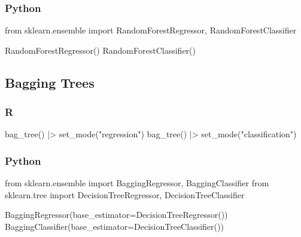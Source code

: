 \documentclass[
  letterpaper,
  DIV=11,
  numbers=noendperiod]{scrreprt}
\newenvironment{Shaded}{\begin{snugshade}}{\end{snugshade}}
\newcommand{\FunctionTok}[1]{\textcolor[rgb]{0.28,0.35,0.67}{#1}}
\newcommand{\ImportTok}[1]{\textcolor[rgb]{0.00,0.46,0.62}{#1}}
\newcommand{\NormalTok}[1]{\textcolor[rgb]{0.00,0.46,0.62}{#1}}
\newcommand{\OperatorTok}[1]{\textcolor[rgb]{0.37,0.37,0.37}{#1}}
\newcommand{\SpecialCharTok}[1]{\textcolor[rgb]{0.37,0.37,0.37}{#1}}
\newcommand{\StringTok}[1]{\textcolor[rgb]{0.13,0.47,0.30}{#1}}
\begin{document}
\hypertarget{python-77}{%
\subsubsection{Python}\label{python-77}}

\begin{Shaded}
\begin{Highlighting}[]
\ImportTok{from}\NormalTok{ sklearn.ensemble }\ImportTok{import}\NormalTok{ RandomForestRegressor, RandomForestClassifier}

\NormalTok{RandomForestRegressor()}
\NormalTok{RandomForestClassifier()}
\end{Highlighting}
\end{Shaded}

\hypertarget{bagging-trees}{%
\subsection{Bagging Trees}\label{bagging-trees}}

\hypertarget{r-78}{%
\subsubsection{R}\label{r-78}}

\begin{Shaded}
\begin{Highlighting}[]
\FunctionTok{bag\_tree}\NormalTok{() }\SpecialCharTok{|\textgreater{}} \FunctionTok{set\_mode}\NormalTok{(}\StringTok{"regression"}\NormalTok{)}
\FunctionTok{bag\_tree}\NormalTok{() }\SpecialCharTok{|\textgreater{}} \FunctionTok{set\_mode}\NormalTok{(}\StringTok{"classification"}\NormalTok{)}
\end{Highlighting}
\end{Shaded}

\hypertarget{python-78}{%
\subsubsection{Python}\label{python-78}}

\begin{Shaded}
\begin{Highlighting}[]
\ImportTok{from}\NormalTok{ sklearn.ensemble }\ImportTok{import}\NormalTok{ BaggingRegressor, BaggingClassifier}
\ImportTok{from}\NormalTok{ sklearn.tree }\ImportTok{import}\NormalTok{ DecisionTreeRegressor, DecisionTreeClassifier}

\NormalTok{BaggingRegressor(base\_estimator}\OperatorTok{=}\NormalTok{DecisionTreeRegressor())}
\NormalTok{BaggingClassifier(base\_estimator}\OperatorTok{=}\NormalTok{DecisionTreeClassifier())}
\end{Highlighting}
\end{Shaded}
\end{document}
